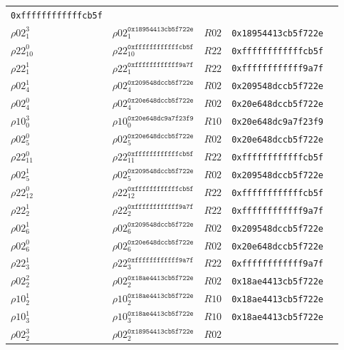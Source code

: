 \begin{longtable}[c]{|l|l|l|l|l|}
  \texttt{0xffffffffffffcb5f} \\
  $\rho02_{1}^{3}$ & $\rho02_{1}^{\texttt{0x18954413cb5f722e}}$ & $R02$ &
  \texttt{0x18954413cb5f722e} \\
  $\rho22_{10}^{0}$ & $\rho22_{10}^{\texttt{0xffffffffffffcb5f}}$ & $R22$ &
  \texttt{0xffffffffffffcb5f} \\
  $\rho22_{1}^{1}$ & $\rho22_{1}^{\texttt{0xffffffffffff9a7f}}$ & $R22$ &
  \texttt{0xffffffffffff9a7f} \\
  $\rho02_{4}^{1}$ & $\rho02_{4}^{\texttt{0x209548dccb5f722e}}$ & $R02$ &
  \texttt{0x209548dccb5f722e} \\
  $\rho02_{4}^{0}$ & $\rho02_{4}^{\texttt{0x20e648dccb5f722e}}$ & $R02$ &
  \texttt{0x20e648dccb5f722e} \\
  $\rho10_{0}^{3}$ & $\rho10_{0}^{\texttt{0x20e648dc9a7f23f9}}$ & $R10$ &
  \texttt{0x20e648dc9a7f23f9} \\
  $\rho02_{5}^{0}$ & $\rho02_{5}^{\texttt{0x20e648dccb5f722e}}$ & $R02$ &
  \texttt{0x20e648dccb5f722e} \\
  $\rho22_{11}^{0}$ & $\rho22_{11}^{\texttt{0xffffffffffffcb5f}}$ & $R22$ &
  \texttt{0xffffffffffffcb5f} \\
  $\rho02_{5}^{1}$ & $\rho02_{5}^{\texttt{0x209548dccb5f722e}}$ & $R02$ &
  \texttt{0x209548dccb5f722e} \\
  $\rho22_{12}^{0}$ & $\rho22_{12}^{\texttt{0xffffffffffffcb5f}}$ & $R22$ &
  \texttt{0xffffffffffffcb5f} \\
  $\rho22_{2}^{1}$ & $\rho22_{2}^{\texttt{0xffffffffffff9a7f}}$ & $R22$ &
  \texttt{0xffffffffffff9a7f} \\
  $\rho02_{6}^{1}$ & $\rho02_{6}^{\texttt{0x209548dccb5f722e}}$ & $R02$ &
  \texttt{0x209548dccb5f722e} \\
  $\rho02_{6}^{0}$ & $\rho02_{6}^{\texttt{0x20e648dccb5f722e}}$ & $R02$ &
  \texttt{0x20e648dccb5f722e} \\
  $\rho22_{3}^{1}$ & $\rho22_{3}^{\texttt{0xffffffffffff9a7f}}$ & $R22$ &
  \texttt{0xffffffffffff9a7f} \\
  $\rho02_{2}^{2}$ & $\rho02_{2}^{\texttt{0x18ae4413cb5f722e}}$ & $R02$ &
  \texttt{0x18ae4413cb5f722e} \\
  $\rho10_{2}^{1}$ & $\rho10_{2}^{\texttt{0x18ae4413cb5f722e}}$ & $R10$ &
  \texttt{0x18ae4413cb5f722e} \\
  $\rho10_{3}^{1}$ & $\rho10_{3}^{\texttt{0x18ae4413cb5f722e}}$ & $R10$ &
  \texttt{0x18ae4413cb5f722e} \\
  $\rho02_{2}^{3}$ & $\rho02_{2}^{\texttt{0x18954413cb5f722e}}$ & $R02$ &

\end{longtable}
